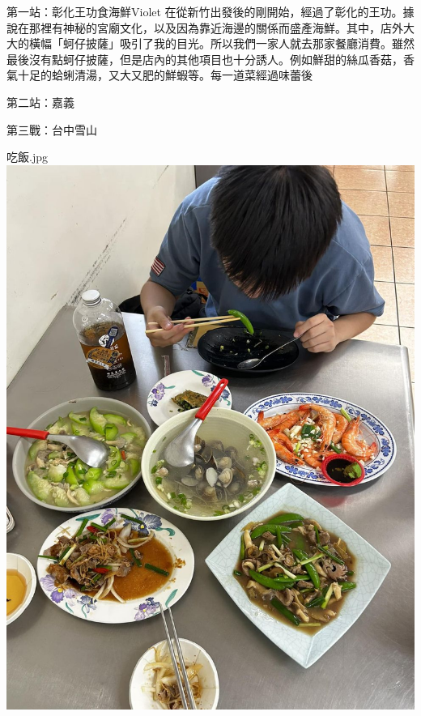 \documentclass{article}
\begin{document}

\begin{large}
\begin{boxpar}{第一站：彰化王功食海鮮}{Violet}
在從新竹出發後的剛開始，經過了彰化的王功。據說在那裡有神秘的宮廟文化，以及因為靠近海邊的關係而盛產海鮮。其中，店外大大的橫幅「蚵仔披薩」吸引了我的目光。所以我們一家人就去那家餐廳消費。雖然最後沒有點蚵仔披薩，但是店內的其他項目也十分誘人。例如鮮甜的絲瓜香菇，香氣十足的蛤蜊清湯，又大又肥的鮮蝦等。每一道菜經過味蕾後
\end{boxpar}
    \begin{boxpar}{第二站：嘉義}
    \end{boxpar}
    \begin{boxpar}{第三戰：台中雪山}
    \end{boxpar}

\begin{imgbox}{吃飯.jpg}
    \includegraphics[width=0.65\textheight]{src/seafood.jpg}
\end{imgbox}
\end{large}
\end{document}
